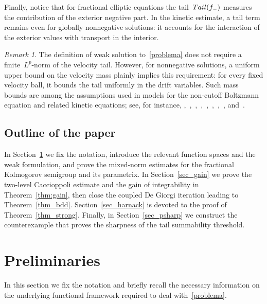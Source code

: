 \documentclass[leqno,10pt]{amsart}
\theoremstyle{plain}
\theoremstyle{remark}
\newtheorem{rem}{Remark}[section]
\numberwithin{equation}{section}
\begin{document}
{Finally, notice that for fractional elliptic equations the tail~${\rm Tail}(f_-)$ measures the contribution of the exterior negative part. In the kinetic estimate, a tail term remains even for globally nonnegative solutions: it accounts for the interaction of the exterior values with transport in the interior.


\begin{rem}
The definition of weak solution to~\eqref{problema} does not require a finite~$L^{p}$-norm of the velocity tail. However, for nonnegative solutions, a uniform upper bound on the velocity mass plainly implies this requirement: for every fixed velocity ball, it bounds the tail uniformly in the drift variables.
Such mass bounds are among the assumptions used in models for the non-cutoff Boltzmann equation and related kinetic equations; see, for instance, {\rm\!\!\cite[Theorems~1.1-1.2]{Sil16},~\cite[Formula~(1.4)]{Mou18},~\cite[Formula~(1.3)]{GIMV19},~\cite[Formula~(1.3)]{IMS20},~\cite[Section~1.4-Assumption~(H)]{IS20a},~\cite[Section~1.3]{IS20},~\cite[Assumption~1.1]{IS22},~\cite[Formula~(1.2)]{OS23}, and~\cite[Formula~(1.9)]{FRW24}}.
\end{rem}


\subsection*{Outline of the paper} In Section~\ref{sec_preliminaries} we fix the notation, introduce the relevant function spaces and the weak formulation, and prove the mixed-norm estimates for the fractional Kolmogorov semigroup and its parametrix.
In Section~\ref{sec_gain} we prove the two-level Caccioppoli estimate and the gain of integrability in Theorem~\ref{thm:gain}, then close the coupled De Giorgi iteration leading to Theorem~\ref{thm_bdd}.
Section~\ref{sec_harnack} is devoted to the proof of Theorem~\ref{thm_strong}.
Finally, in Section~\ref{sec_psharp} we construct the counterexample that proves the sharpness of the tail summability threshold.






\medskip\section{Preliminaries}\label{sec_preliminaries}
In this section we fix the notation and briefly recall the necessary information on the underlying functional framework required to deal with~\eqref{problema}.

}
\end{document}
